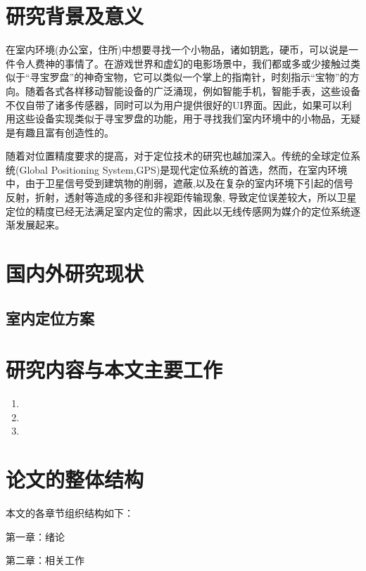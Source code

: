 \documentclass[winfonts]{njuthesis}
\begin{document}
	\section{研究背景及意义}
		在室内环境(办公室，住所)中想要寻找一个小物品，诸如钥匙，硬币，可以说是一件令人费神的事情了\cite{HyperEarAbstract}。在游戏世界和虚幻的电影场景中，我们都或多或少接触过类似于“寻宝罗盘”的神奇宝物，它可以类似一个掌上的指南针，时刻指示“宝物”的方向。随着各式各样移动智能设备的广泛涌现，例如智能手机，智能手表，这些设备不仅自带了诸多传感器，同时可以为用户提供很好的UI界面。因此，如果可以利用这些设备实现类似于寻宝罗盘的功能，用于寻找我们室内环境中的小物品，无疑是有趣且富有创造性的。
		
		随着对位置精度要求的提高，对于定位技术的研究也越加深入。传统的全球定位系统(Global Positioning System,GPS)\cite{wikipedia_GPS}是现代定位系统的首选，然而，在室内环境中，由于卫星信号受到建筑物的削弱，遮蔽,以及在复杂的室内环境下引起的信号反射，折射，透射等造成的多径和非视距传输现象, 导致定位误差较大，所以卫星定位的精度已经无法满足室内定位的需求，因此以无线传感网为媒介的定位系统逐渐发展起来。
		
		
	
	\section{国内外研究现状}
		\subsection{室内定位方案}

	\section{研究内容与本文主要工作}

		\begin{enumerate}
		\item
			
		\item
			
		\item 
			
		\end{enumerate}

	\section{论文的整体结构}
		本文的各章节组织结构如下：
		
		第一章：绪论
		
		第二章：相关工作
		
\end{document}
